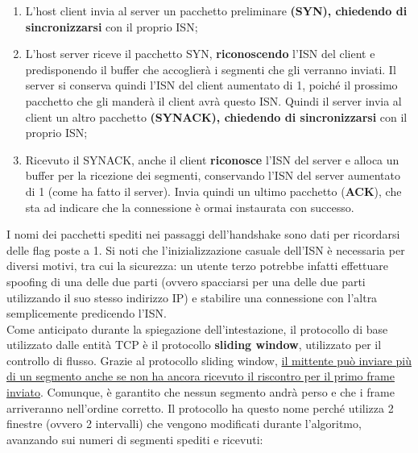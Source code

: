         \begin{enumerate}
            \item L’host client invia al server un pacchetto preliminare \textbf{(SYN), chiedendo di
            sincronizzarsi} con il proprio ISN;
            \item  L’host server riceve il pacchetto SYN, \textbf{riconoscendo} l’ISN del client e predisponendo il
            buffer che accoglierà i segmenti che gli verranno inviati. Il server si conserva quindi l’ISN
            del client aumentato di 1, poiché il prossimo pacchetto che gli manderà il client avrà
            questo ISN. Quindi il server invia al client un altro pacchetto \textbf{(SYNACK), chiedendo di
            sincronizzarsi} con il proprio ISN;
            \item Ricevuto il SYNACK, anche il client \textbf{riconosce} l’ISN del server e alloca un buffer per la
            ricezione dei segmenti, conservando l’ISN del server aumentato di 1 (come ha fatto il
            server). Invia quindi un ultimo pacchetto (\textbf{ACK}), che sta ad indicare che la connessione
            è ormai instaurata con successo. 
                        
        \end{enumerate}

        I nomi dei pacchetti spediti nei passaggi dell’handshake sono dati per ricordarsi delle flag poste
        a 1. Si noti che l’inizializzazione casuale dell’ISN è necessaria per diversi motivi, tra cui la
        sicurezza: un utente terzo potrebbe infatti effettuare spoofing di una delle due parti (ovvero
        spacciarsi per una delle due parti utilizzando il suo stesso indirizzo IP) e stabilire una
        connessione con l’altra semplicemente predicendo l’ISN.\\
        
        Come anticipato durante la spiegazione dell’intestazione, il protocollo di base utilizzato dalle entità TCP è il protocollo \textbf{sliding window}, utilizzato per il controllo di flusso.
        Grazie al protocollo sliding window, \underline{il mittente può inviare più di un segmento anche se non ha ancora ricevuto il riscontro per il primo frame inviato}.
        Comunque, è garantito che nessun segmento andrà perso e che i frame arriveranno nell’ordine corretto. Il protocollo ha questo nome perché utilizza 2 finestre (ovvero 2 intervalli) che vengono modificati durante l’algoritmo, avanzando sui numeri di segmenti spediti e ricevuti:
        
